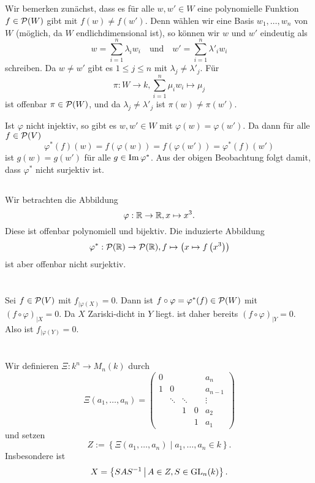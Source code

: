 \documentclass[a4paper,10pt]{article}
\begin{document}
\subsection{}
Wir bemerken zunächst, dass es für alle $w, w' \in W$ eine polynomielle Funktion $f \in \mathcal{P}(W)$ gibt mit $f(w) \neq f(w')$. Denn wählen wir eine Basis $w_1, \ldots, w_n$ von $W$ (möglich, da $W$ endlichdimensional ist), so können wir $w$ und $w'$ eindeutig als
\[
 w = \sum_{i=1}^n \lambda_i w_i \quad \text{und} \quad w' = \sum_{i=1}^n \lambda'_i w_i
\]
schreiben. Da $w \neq w'$ gibt es $1 \leq j \leq n$ mit $\lambda_j \neq \lambda'_j$. Für
\[
 \pi : W \to k, \sum_{i=1}^n \mu_i w_i \mapsto \mu_j
\]
ist offenbar $\pi \in \mathcal{P}(W)$, und da $\lambda_j \neq \lambda'_j$ ist $\pi(w) \neq \pi(w')$.

Ist $\varphi$ nicht injektiv, so gibt es $w, w' \in W$ mit $\varphi(w) = \varphi(w')$. Da dann für alle $f \in \mathcal{P}(V)$
\[
 \varphi^*(f)(w) = f(\varphi(w)) = f(\varphi(w')) = \varphi^*(f)(w')
\]
ist $g(w) = g(w')$ für alle $g \in \operatorname{Im} \varphi^*$. Aus der obigen Beobachtung folgt damit, dass $\varphi^*$ nicht surjektiv ist.


\subsection{}
Wir betrachten die Abbildung
\[
 \varphi : \mathbb{R} \to \mathbb{R}, x \mapsto x^3.
\]
Diese ist offenbar polynomiell und bijektiv. Die induzierte Abbildung
\[
 \varphi^* : \mathcal{P}(\mathbb{R}) \to \mathcal{P}(\mathbb{R}), f \mapsto \left( x \mapsto f\left(x^3\right) \right)
\]
ist aber offenbar nicht surjektiv.





\section{}
Sei $f \in \mathcal{P}(V)$ mit $f_{|\varphi(X)} = 0$. Dann ist $f \circ \varphi = \varphi^*(f) \in \mathcal{P}(W)$ mit $(f \circ \varphi)_{|X} = 0$. Da $X$ Zariski-dicht in $Y$ liegt. ist daher bereits $(f \circ \varphi)_{|Y} = 0$. Also ist $f_{|\varphi(Y)} = 0$.





\section{}
Wir definieren $\Xi : k^n \to M_n(k)$ durch
\[
 \Xi(a_1, \ldots, a_n) = 
 \begin{pmatrix}
  0 &        &        &   & a_n     \\
  1 &      0 &        &   & a_{n-1} \\
    & \ddots & \ddots &   & \vdots  \\
    &        &      1 & 0 & a_2     \\
    &        &        & 1 & a_1
 \end{pmatrix}
\]
und setzen
\[
 Z := \left\{ \Xi(a_1, \ldots, a_n) \mid a_1, \ldots, a_n \in k \right\}.
\]
Insbesondere ist
\begin{equation}\label{eq: X als Orbit von Z}  
 X = \left\{ SAS^{-1} \,\middle|\, A \in Z, S \in \operatorname{GL}_n(k) \right\}.
\end{equation}
\end{document}
